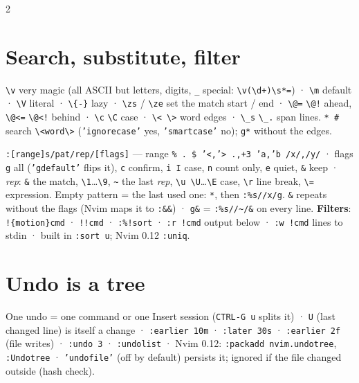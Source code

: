 \documentclass[8pt]{extarticle}
\newcommand\ct[1]{\texttt{#1}}
\newcommand\bs{\textbackslash}
\newcommand\tl{\textasciitilde}
\newcommand\bang{\mbox{!}\mbox{!}}
\newcommand\sls{\mbox{/}\mbox{/}}
\begin{document}
\begin{multicols}{2}
\section{Search, substitute, filter}
\ct{\bs v} very magic (all ASCII but letters, digits, \ct{\_} special: \ct{\bs v(\bs d+)\bs s*=}) · \ct{\bs m}
default · \ct{\bs V} literal · \ct{\bs\{-\}} lazy · \ct{\bs zs} / \ct{\bs ze} set the match start /
end · \ct{\bs{}@=} \ct{\bs{}@!} ahead, \ct{\bs{}@<=} \ct{\bs{}@<!} behind · \ct{\bs c} \ct{\bs C} case ·
\ct{\bs< \bs>} word edges · \ct{\bs\_s} \ct{\bs\_.} span lines. \ct{* \#} search
\ct{\bs<word\bs>} (\texttt{'ignorecase'} yes, \texttt{'smartcase'} no); \ct{g*} without the edges.\par
\ct{:[range]s/pat/rep/[flags]} — range \ct{\% . \$ '<,'> .,+3 'a,'b /x/,/y/} · flags \ct{g} all
(\texttt{'gdefault'} flips it), \ct{c} confirm, \ct{i I} case, \ct{n} count only, \ct{e} quiet,
\ct{\&} keep · \emph{rep}: \ct{\&} the match, \ct{\bs 1}…\ct{\bs 9}, \ct{\tl} the last \emph{rep},
\ct{\bs u \bs U}…\ct{\bs E} case, \ct{\bs r} line break, \ct{\bs=} expression. Empty pattern =
the last used one: \ct{*}, then \ct{:\%s\sls{}x/g}. \ct{\&} repeats without the flags (Nvim maps
it to \ct{:\&\&}) · \ct{g\&} = \ct{:\%s//\tl/\&} on every line. \textbf{Filters}:
\ct{!\{motion\}cmd} · \ct{\bang{}cmd} · \ct{:\%!sort} · \ct{:r !cmd} output below · \ct{:w !cmd}
lines to stdin · built in \ct{:sort u}; Nvim 0.12 \ct{:uniq}.

\section{Undo is a tree}
\par
One undo = one command or one Insert session (\ct{CTRL-G u} splits it) · \ct{U} (last changed
line) is itself a change · \ct{:earlier 10m} · \ct{:later 30s} · \ct{:earlier 2f} (file
writes) · \ct{:undo 3} · \ct{:undolist} · Nvim 0.12: \ct{:packadd nvim.undotree},
\ct{:Undotree} · \texttt{'undofile'} (off by default) persists it; ignored if the file changed
outside (hash check).


\end{multicols}
\end{document}
